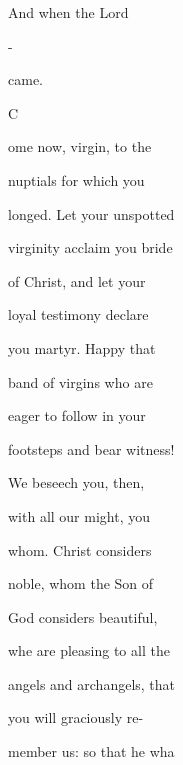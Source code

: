 \documentclass{breviary}
\begin{document}
\begin{brevbody}
And when the Lord

-

came.

\opening[rubric]{C}{ome} now, virgin, to the

nuptials for which you

longed. Let your unspotted

virginity acclaim you bride

of Christ, and let your

loyal testimony declare

you martyr. Happy that

band of virgins who are

eager to follow in your

footsteps and bear witness!

We beseech you, then,

with all our might, you

whom. Christ considers

noble, whom the Son of

God considers beautiful,

whe are pleasing to all the

angels and archangels, that

you will graciously re-

member us: so that he wha

\end{brevbody}
\end{document}
